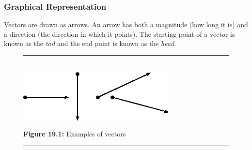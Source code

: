       \label{m38812*uid2}
            \subsubsection{ Graphical Representation}
            \nopagebreak
            
        
        \label{m38812*id186285}Vectors are drawn as arrows. An arrow has both a magnitude (how long it is) and a direction (the direction in which it points). The starting point of a vector is known as the \textsl{tail} and the end point is known as the \textsl{head}.\par 
        
    \setcounter{subfigure}{0}


	\begin{figure}[H] %
    \begin{center}
    \rule[.1in]{\figurerulewidth}{.005in} \\
        \label{m38812*uid3!!!underscore!!!media}\label{m38812*uid3!!!underscore!!!printimage}\includegraphics[width=300px]{col11305.imgs/m38812_PG11C1_001.png} %
        
      \vspace{2pt}
    \vspace{\rubberspace}\par \begin{cnxcaption}
	  \small \textbf{Figure 19.1: }Examples of vectors
	\end{cnxcaption}
      
    \vspace{.1in}
    \rule[.1in]{\figurerulewidth}{.005in} \\
        
    \end{center}

 \end{figure}   

    \addtocounter{footnote}{-0}
    
        
    \setcounter{subfigure}{0}



